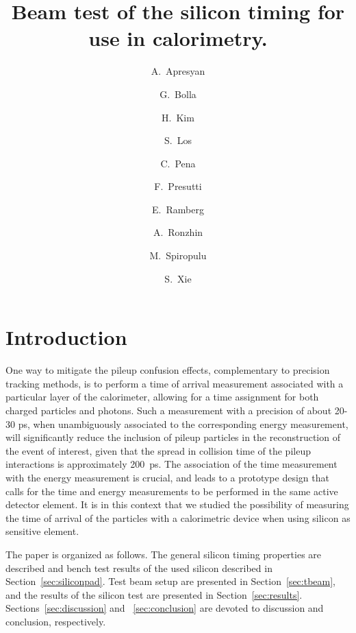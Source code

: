 \documentclass[12pt]{article}
\title{Beam test of the silicon timing for use in calorimetry.
}
\author[1]{A.~Apresyan}
\author[2]{G.~Bolla}
\author[3]{H.~Kim}
\author[2]{S.~Los}
\author[1]{C.~Pena}
\author[1]{F.~Presutti}
\author[2]{E.~Ramberg}
\author[2]{A.~Ronzhin}
\author[1]{M.~Spiropulu}
\author[1]{S.~Xie}
\affil[1]{California Institute of Technology, Pasadena, CA, USA}
\affil[2]{Fermi National Accelerator Laboratory, Batavia, IL, USA}
\affil[3]{University of Chicago, Chicago, IL,  USA}
\date{}
\begin{document}
\linenumbers
\maketitle



\section{Introduction} 

One way to mitigate the pileup confusion effects, complementary to precision
tracking methods, is to perform a time of arrival measurement associated with a
particular layer of the calorimeter, allowing for a time assignment for both
charged particles and photons. Such a measurement with a precision of about
20-30 ps, when unambiguously associated to the corresponding energy measurement,
will significantly reduce the inclusion of pileup particles in the
reconstruction of the event of interest, given that the spread in collision time
of the pileup interactions is approximately 200~ps. The association of the time
measurement with the energy measurement is crucial, and leads to a prototype
design that calls for the time and energy measurements to be performed in the
same active detector element. It is in this context that we studied the
possibility of measuring the time of arrival of the particles with a
calorimetric device when using silicon as sensitive element. 

The paper is organized as follows. The general silicon timing properties are
described and bench test results of the used silicon described in
Section~\ref{sec:siliconpad}. Test beam setup are presented in
Section~\ref{sec:tbeam}, and the results of the silicon test are presented in
Section~\ref{sec:results}. Sections~\ref{sec:discussion} and
~\ref{sec:conclusion} are devoted to discussion and conclusion, respectively.
\end{document}
